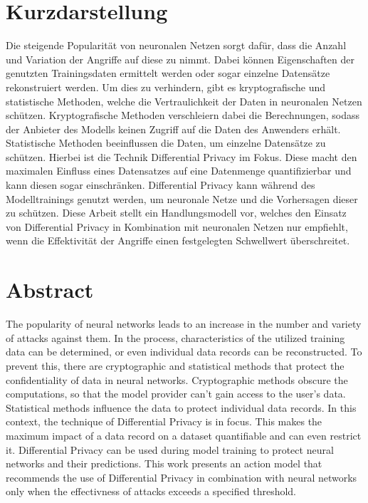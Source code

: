 \thispagestyle{empty}
\section*{Kurzdarstellung}
\label{sec:kurzdarstellung}
Die steigende Popularität von neuronalen Netzen sorgt dafür, dass die Anzahl und Variation der Angriffe auf diese zu nimmt.
Dabei können Eigenschaften der genutzten Trainingsdaten ermittelt werden oder sogar einzelne Datensätze rekonstruiert werden.
Um dies zu verhindern, gibt es kryptografische und statistische Methoden, welche die Vertraulichkeit der Daten in neuronalen Netzen schützen. 
Kryptografische Methoden verschleiern dabei die Berechnungen, sodass der Anbieter des Modells keinen Zugriff auf die Daten des Anwenders erhält. 
Statistische Methoden beeinflussen die Daten, um einzelne Datensätze zu schützen.
Hierbei ist die Technik Differential Privacy im Fokus. 
Diese macht den maximalen Einfluss eines Datensatzes auf eine Datenmenge quantifizierbar und kann diesen sogar einschränken.
Differential Privacy kann während des Modelltrainings genutzt werden, um neuronale Netze und die Vorhersagen dieser zu schützen.
Diese Arbeit stellt ein Handlungsmodell vor, welches den Einsatz von Differential Privacy in Kombination mit neuronalen Netzen nur empfiehlt, wenn die Effektivität der Angriffe einen festgelegten Schwellwert überschreitet.


\section*{Abstract}
\label{sec:abstract}
The popularity of neural networks leads to an increase in the number and variety of attacks against them. 
In the process, characteristics of the utilized training data can be determined, or even individual data records can be reconstructed. 
To prevent this, there are cryptographic and statistical methods that protect the confidentiality of data in neural networks.
Cryptographic methods obscure the computations, so that the model provider can't gain access to the user's data.
Statistical methods influence the data to protect individual data records. 
In this context, the technique of Differential Privacy is in focus. 
This makes the maximum impact of a data record on a dataset quantifiable and can even restrict it. 
Differential Privacy can be used during model training to protect neural networks and their predictions.
This work presents an action model that recommends the use of Differential Privacy in combination with neural networks only when the effectivness of attacks exceeds a specified threshold.